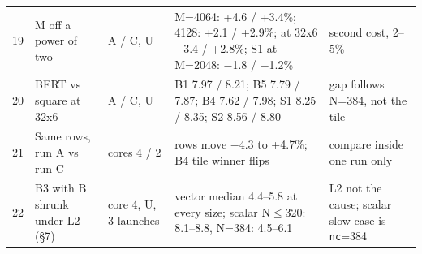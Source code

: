 \documentclass[10pt,a4paper]{article}
\begin{document}
{\begin{tabularx}{\linewidth}{@{}l >{\raggedright\arraybackslash}p{3.1cm} >{\raggedright\arraybackslash}p{2.0cm} >{\raggedright\arraybackslash}X >{\raggedright\arraybackslash}p{3.5cm}@{}}
19 & M off a power of two & A / C, U & M=4064: +4.6 / +3.4\%; 4128: +2.1 / +2.9\%; at 32x6 +3.4 / +2.8\%; S1 at M=2048: $-$1.8 / $-$1.2\% & second cost, 2--5\% \\
20 & BERT vs square at 32x6 & A / C, U & B1 7.97 / 8.21; B5 7.79 / 7.87; B4 7.62 / 7.98; S1 8.25 / 8.35; S2 8.56 / 8.80 & gap follows N=384, not the tile \\
21 & Same rows, run A vs run C & cores 4 / 2 & rows move $-$4.3 to +4.7\%; B4 tile winner flips & compare inside one run only \\
22 & B3 with B shrunk under L2 (\S7) & core 4, U, 3 launches & vector median 4.4--5.8 at every size; scalar N$\le$320: 8.1--8.8, N=384: 4.5--6.1 & L2 not the cause; scalar slow case is \texttt{nc}=384 \\
\bottomrule
\end{tabularx}}
\end{document}
